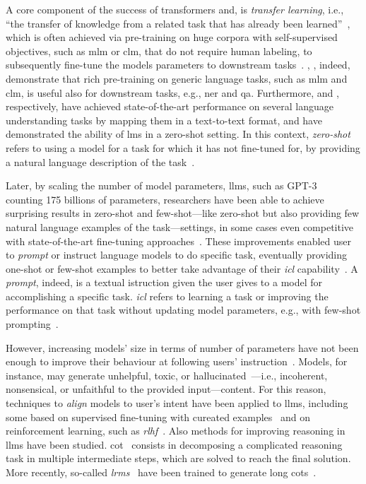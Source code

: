 A core component of the success of transformers and, is \emph{transfer learning}, i.e., ``the transfer of knowledge from a related task that has already been learned''~\cite{torrey2010transfer}, which is often achieved via pre-training on huge corpora with self-supervised objectives, such as \ac{mlm} or \ac{clm}, that do not require human labeling, to subsequently fine-tune the models parameters to downstream tasks~\cite{jm3,devlin-etal-2019-bert,radford2018improving,Raffel2020t5}.
\textcite{devlin-etal-2019-bert}, \textcite{radford2018improving}, indeed, demonstrate that rich pre-training on generic language tasks, such as \acl{mlm} and \ac{clm}, is useful also for downstream tasks, e.g., \ac{ner} and \ac{qa}. Furthermore, \textcite{Raffel2020t5} and \textcite{radford2019unsupervised_learners}, respectively, have achieved state-of-the-art performance on several language understanding tasks by mapping them in a text-to-text format, and have demonstrated the ability of \acp{lm} in a zero-shot setting. In this context, \emph{zero-shot} refers to using a model for a task for which it has not fine-tuned for, by providing a natural language description of the task~\cite{browngpt3}.

Later, by scaling the number of model parameters, \acfp{llm}, such as GPT-3~\cite{browngpt3} counting 175 billions of parameters, researchers have been able to achieve surprising results in zero-shot and few-shot---like zero-shot but also providing few natural language examples of the task---settings, in some cases even competitive with state-of-the-art fine-tuning approaches~\cite{browngpt3}.
These improvements enabled user to \emph{prompt} or instruct language models to do specific task, eventually providing one-shot or few-shot examples to better take advantage of their \emph{\acf{icl}} capability~\cite{jm3}. A \emph{prompt}, indeed, is a textual istruction given the user gives to a model for accomplishing a specific task. \emph{\Ac{icl}} refers to learning a task or improving the performance on that task without updating model parameters, e.g., with few-shot prompting~\cite{jm3}.

However, increasing models' size in terms of number of parameters have not been enough to improve their behaviour at following users' instruction~\cite{instruct_gpt_2022}. Models, for instance, may generate unhelpful, toxic, or hallucinated~\cite{maynez-etal-2020-faithfulness-hallucination,ji_etal-2023-survey-hallucination}---i.e., incoherent, nonsensical, or unfaithful to the provided input---content. For this reason, techniques to \emph{align} models to user's intent have been applied to \acp{llm}, including some based on supervised fine-tuning with cureated examples~\cite{zhou2023lima} and on reinforcement learning, such as \emph{\acf{rlhf}}~\cite{instruct_gpt_2022}.
Also methods for improving reasoning in \acp{llm} have been studied. \Acf{cot}~\cite{wei2022chainofthought} consists in decomposing a complicated reasoning task in multiple intermediate steps, which are solved to reach the final solution. More recently, so-called \emph{\acfp{lrm}}~\cite{tie2025surveyposttraininglargelanguage} have been trained to generate long \aclp{cot}~\cite{openai2024openaio1card,deepseekai2025deepseekr1incentivizingreasoningcapability}.

